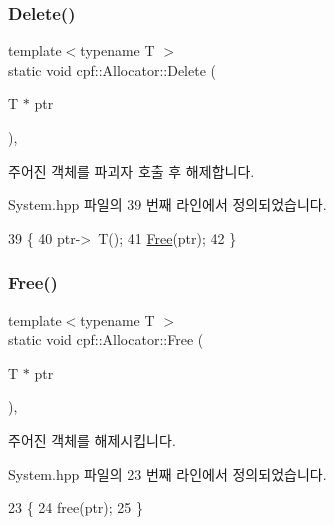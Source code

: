 \subsubsection{\texorpdfstring{Delete()}{Delete()}}
{\footnotesize\ttfamily template$<$typename T $>$ \\
static void cpf\+::\+Allocator\+::\+Delete (\begin{DoxyParamCaption}\item[{T $\ast$}]{ptr }\end{DoxyParamCaption})\hspace{0.3cm}{\ttfamily [inline]}, {\ttfamily [static]}}

주어진 객체를 파괴자 호출 후 해제합니다. 

System.\+hpp 파일의 39 번째 라인에서 정의되었습니다.


\begin{DoxyCode}
39                                    \{
40             ptr->~T();
41             \hyperlink{classcpf_1_1_allocator_af63eadbfa53045d7eede980fd5d15eb4}{Free}(ptr);
42         \}
\end{DoxyCode}
\mbox{\label{classcpf_1_1_allocator_af63eadbfa53045d7eede980fd5d15eb4}} 
\subsubsection{\texorpdfstring{Free()}{Free()}}
{\footnotesize\ttfamily template$<$typename T $>$ \\
static void cpf\+::\+Allocator\+::\+Free (\begin{DoxyParamCaption}\item[{T $\ast$}]{ptr }\end{DoxyParamCaption})\hspace{0.3cm}{\ttfamily [inline]}, {\ttfamily [static]}}

주어진 객체를 해제시킵니다. 

System.\+hpp 파일의 23 번째 라인에서 정의되었습니다.


\begin{DoxyCode}
23                                  \{
24             free(ptr);
25         \}
\end{DoxyCode}
\mbox{\label{classcpf_1_1_allocator_ab224979f67fae21e9db39b211a67b2e9}} 

